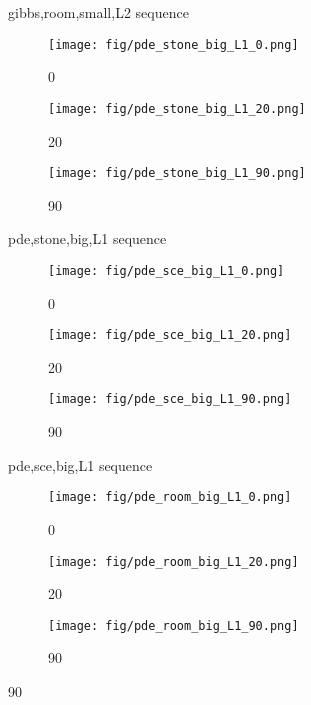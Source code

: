 \begin{figure}
  \caption{gibbs,room,small,L2 sequence}
  \label{fig:three_images}
\end{figure}\begin{figure} 
    \centering
    \begin{subfigure}[b]{0.3\textwidth}
    \texttt{[image: fig/pde\_stone\_big\_L1\_0.png]}
    \caption{0}
    \label{fig:image1}
  \end{subfigure}
  \hfill
  \begin{subfigure}[b]{0.3\textwidth}
    \texttt{[image: fig/pde\_stone\_big\_L1\_20.png]}
    \caption{20}
    \label{fig:image2}
  \end{subfigure}
  \hfill
  \begin{subfigure}[b]{0.3\textwidth}
    \texttt{[image: fig/pde\_stone\_big\_L1\_90.png]}
    \caption{90}
    \label{fig:image3}
  \end{subfigure}

  \caption{pde,stone,big,L1 sequence}
  \label{fig:three_images}
\end{figure}\begin{figure} 
    \centering
    \begin{subfigure}[b]{0.3\textwidth}
    \texttt{[image: fig/pde\_sce\_big\_L1\_0.png]}
    \caption{0}
    \label{fig:image1}
  \end{subfigure}
  \hfill
  \begin{subfigure}[b]{0.3\textwidth}
    \texttt{[image: fig/pde\_sce\_big\_L1\_20.png]}
    \caption{20}
    \label{fig:image2}
  \end{subfigure}
  \hfill
  \begin{subfigure}[b]{0.3\textwidth}
    \texttt{[image: fig/pde\_sce\_big\_L1\_90.png]}
    \caption{90}
    \label{fig:image3}
  \end{subfigure}

  \caption{pde,sce,big,L1 sequence}
  \label{fig:three_images}
\end{figure}\begin{figure} 
    \centering
    \begin{subfigure}[b]{0.3\textwidth}
    \texttt{[image: fig/pde\_room\_big\_L1\_0.png]}
    \caption{0}
    \label{fig:image1}
  \end{subfigure}
  \hfill
  \begin{subfigure}[b]{0.3\textwidth}
    \texttt{[image: fig/pde\_room\_big\_L1\_20.png]}
    \caption{20}
    \label{fig:image2}
  \end{subfigure}
  \hfill
  \begin{subfigure}[b]{0.3\textwidth}
    \texttt{[image: fig/pde\_room\_big\_L1\_90.png]}
    \caption{90}
    \label{fig:image3}
  \end{subfigure}


\end{figure}
